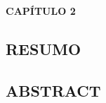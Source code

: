 \documentclass[11pt,letterpaper]{article}
\begin{document}

\noindent
\begin{minipage}[t]{0.2\textwidth}
\textbf{CAPÍTULO 2}
\end{minipage}
\begin{minipage}[t]{0.8\textwidth}
\begin{flushleft}
\textbf{\titlecapC} 
\end{flushleft}
\end{minipage}
\vspace{0.8cm}


\begin{center}
\section*{RESUMO} 
\end{center}

\begin{singlespace}

\end{singlespace}

\newpage
\begin{center}
\section*{ABSTRACT} 
\end{center}

\begin{singlespace}

\end{singlespace}


\newpage



\begin{flushleft}
\renewcommand\refname{}
\vspace*{-0.9cm}
\begin{singlespace}
 
\end{singlespace}
\end{flushleft}

\end{document}
